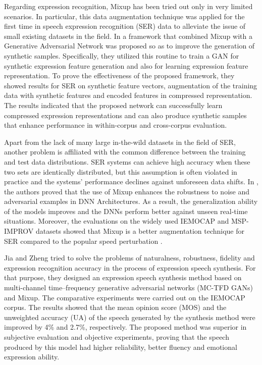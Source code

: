 \documentclass[10pt,twocolumn,letterpaper]{article}
\begin{document}
Regarding expression recognition, Mixup has been tried out only in very limited scenarios. In particular, this data augmentation technique was applied for the first time in speech expression recognition (SER) data to alleviate the issue of small existing datasets in the field. In \cite{latif2020augmenting} a framework that combined Mixup with a Generative Adversarial Network was proposed so as to improve the generation of synthetic samples. Specifically, they utilized this routine to train a GAN for synthetic expression feature generation and also for learning expression feature representation. To prove the effectiveness of the proposed framework, they showed results for SER on synthetic feature vectors, augmentation of the training data with synthetic features and encoded features in compressed representation. The results indicated that the proposed network can successfully learn compressed expression representations and can also produce synthetic samples that enhance performance in within-corpus and cross-corpus evaluation. 

Apart from the lack of many large in-the-wild datasets in the field of SER, another problem is affiliated with the common difference between the training and test data distributions. SER systems can achieve high accuracy when these two sets are identically distributed, but this assumption is often violated in practice and the systems' performance declines against unforeseen data shifts. In \cite{latif2020deep}, the authors proved that the use of Mixup enhances the robustness to noise and adversarial examples in DNN Architectures. As a result, the generalization ability of the models improves and the DNNs perform better against unseen real-time situations. Moreover, the evaluations on the widely used IEMOCAP and MSP-IMPROV datasets showed that Mixup is a better augmentation technique for SER compared to the popular speed perturbation \cite{latif2019direct}.

Jia and Zheng \cite{jia2021emotion} tried to solve the problems of naturalness, robustness, fidelity and expression recognition accuracy in the process of expression speech synthesis. For that purpose, they designed an expression speech synthesis method based on multi-channel time–frequency generative adversarial networks (MC-TFD GANs) and Mixup. The comparative experiments were carried out on the IEMOCAP corpus. The results showed that the mean opinion score (MOS) and the unweighted accuracy (UA) of the speech generated by the synthesis method were improved by 4\% and 2.7\%, respectively. The proposed method was superior in subjective evaluation and objective experiments, proving that the speech produced by this model had higher reliability, better fluency and emotional expression ability.
\end{document}
